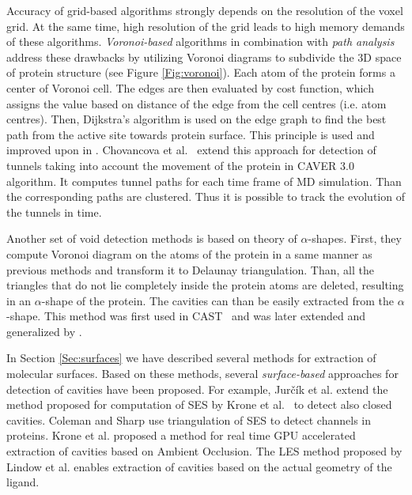Accuracy of grid-based algorithms strongly depends on the resolution of the voxel grid. At the same time, high resolution of the grid leads to high memory demands of these algorithms. \textit{Voronoi-based} algorithms in combination with \textit{path analysis} address these drawbacks by utilizing Voronoi diagrams to subdivide the 3D space of protein structure (see Figure \ref{Fig:voronoi}). Each atom of the protein forms a center of Voronoi cell. The edges are then evaluated by cost function, which assigns the value based on distance of the edge from the cell centres (i.e. atom centres). Then, Dijkstra's algorithm is used on the edge graph to find the best path from the active site towards protein surface. This principle is used and improved upon in \cite{Petrek2007MOLE, caver20, Yaffe2008MolAxis}. Chovancova et al.~\cite{caver30} extend this approach for detection of tunnels taking into account the movement of the protein in CAVER 3.0 algorithm. It computes tunnel paths for each time frame of MD simulation. Than the corresponding paths are clustered. Thus it is possible to track the evolution of the tunnels in time.

Another set of void detection methods is based on theory of $\alpha$-shapes. First, they compute Voronoi diagram on the atoms of the protein in a same manner as previous methods and transform it to Delaunay triangulation. Than, all the triangles that do not lie completely inside the protein atoms are deleted, resulting in an $\alpha$-shape of the protein. The cavities can than be easily extracted from the $\alpha$-shape. This method was first used in CAST~\cite{liang1998anatomy} and was later extended and generalized by \cite{sridharamurthy2016extraction, kim2013tunnels, masood2015chexvis}.

In Section \ref{Sec:surfaces} we have described several methods for extraction of molecular surfaces. Based on these methods, several \textit{surface-based} approaches for detection of cavities have been proposed. For example, Jurčík et al. \cite{jurvcik2016accelerated} extend the method proposed for computation of SES by Krone et al.~\cite{6094043} to detect also closed cavities. Coleman and Sharp \cite{Coleman2009CHUNNEL} use triangulation of SES to detect channels in proteins. Krone et al. \cite{krone2013interactive, krone2014visual} proposed a method for real time GPU accelerated extraction of cavities based on Ambient Occlusion. The LES method proposed by Lindow et al. \cite{lindow2014ligand} enables extraction of cavities based on the actual geometry of the ligand.

